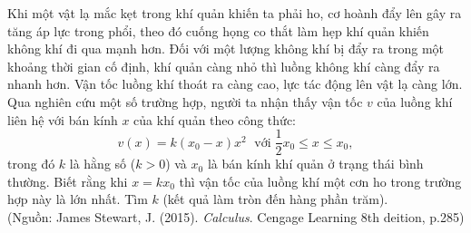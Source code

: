 \begin{bt}%
	Khi một vật lạ mắc kẹt trong khí quản khiến ta phải ho, cơ hoành đẩy lên gây ra tăng áp lực trong phổi, theo đó cuống họng co thắt làm hẹp khí quản khiến không khí đi qua mạnh hơn. Đối với một lượng không khí bị đẩy ra trong một khoảng thời gian cố định, khí quản càng nhỏ thì luồng không khí càng đẩy ra nhanh hơn. Vận tốc luồng khí thoát ra càng cao, lực tác động lên vật lạ càng lớn. Qua nghiên cứu một số trường hợp, người ta nhận thấy vận tốc $v$ của luồng khí liên hệ với bán kính $x$ của khí quản theo công  thức:
	\[v(x)=k(x_0-x)x^2\; \text{  với}\; \dfrac{1}{2}x_0\leq x\leq x_0,\]
	trong đó $k$ là hằng số ($k>0$) và $x_0$ là bán kính khí quản ở trạng thái bình thường. Biết rằng khi $x=kx_0$ thì vận tốc của luồng khí một  cơn ho trong trường hợp này là lớn nhất. Tìm $k$ (kết quả làm tròn đến hàng phần trăm).\\
	(Nguồn: James Stewart, J. (2015). \textit{Calculus}. Cengage Learning 8th  deition, p.285)
\end{bt}

